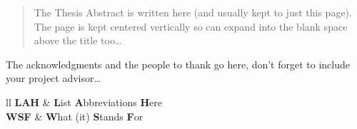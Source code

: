 \documentclass[
11pt,                   %
english,                %
singlespacing,          %
headsepline,            %
]{MastersDoctoralThesis}
\begin{document}

\begin{abstract}
\addchaptertocentry{\abstractname}
The Thesis Abstract is written here (and usually kept to just this page). The page is kept centered vertically so can expand into the blank space above the title too\ldots
\end{abstract}



\begin{acknowledgements}
\addchaptertocentry{\acknowledgementname}
The acknowledgments and the people to thank go here, don't forget to include your project advisor\ldots
\end{acknowledgements}



\tableofcontents %

\listoffigures %

\listoftables %



\begin{abbreviations}{ll}
\textbf{LAH} & \textbf{L}ist \textbf{A}bbreviations \textbf{H}ere\\
\textbf{WSF} & \textbf{W}hat (it) \textbf{S}tands \textbf{F}or\\
\end{abbreviations}


\end{document}
